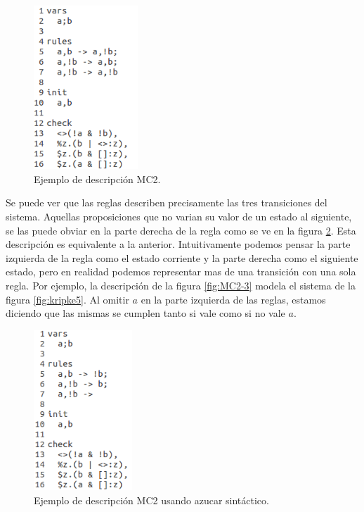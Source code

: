 \begin{figure}[H]
  \centering
  \includegraphics[width=0.35\textwidth]{Figures/modeloMC2-1.png}
  \caption{Ejemplo de descripción MC2.}
  \label{fig:MC2-1}
\end{figure}

\noindent Se puede ver que las reglas describen precisamente las tres transiciones del sistema. Aquellas proposiciones que no varian su valor de un estado al siguiente, se las puede obviar en la parte derecha de la regla como se ve en la figura \ref{fig:MC2-2}. Esta descripción es equivalente a la anterior. Intuitivamente podemos pensar la parte izquierda de la regla como el estado corriente y la parte derecha como el siguiente estado, pero en realidad podemos representar mas de una transición con una sola regla. Por ejemplo, la descripción de la figura \ref{fig:MC2-3} modela el sistema de la figura \ref{fig:kripke5}. Al omitir $a$ en la parte izquierda de las reglas, estamos diciendo que las mismas se cumplen tanto si vale como si no vale $a$.

\begin{figure}[H]
  \centering
  \includegraphics[width=0.33\textwidth]{Figures/modeloMC2-2.png}
  \caption{Ejemplo de descripción MC2 usando azucar sintáctico.}
  \label{fig:MC2-2}
\end{figure}

